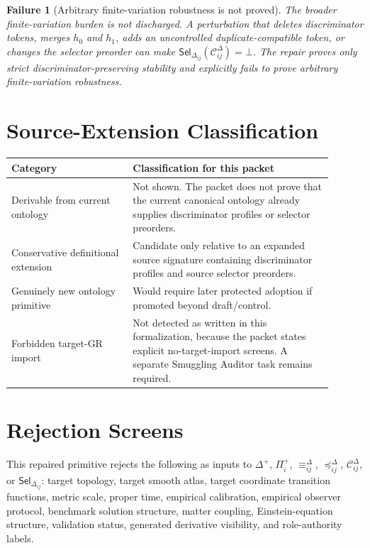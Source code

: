 \documentclass[11pt]{article}
\newcommand{\Disc}{\Delta^{+}}
\newcommand{\Prof}{\Pi^{+}}
\newcommand{\Cand}{\mathcal{C}^{\Delta}}
\newcommand{\Sel}{\mathsf{Sel}_{\Delta}}
\newtheorem{failure}{Failure}
\begin{document}
\begin{failure}[Arbitrary finite-variation robustness is not proved]
The broader finite-variation burden is not discharged. A perturbation that
deletes discriminator tokens, merges \(h_0\) and \(h_1\), adds an
uncontrolled duplicate-compatible token, or changes the selector preorder can
make \(\Sel_{ij}(\Cand_{ij})=\bot\). The repair proves only strict
discriminator-preserving stability and explicitly fails to prove arbitrary
finite-variation robustness.
\end{failure}

\section{Source-Extension Classification}

\begin{center}
\begin{tabular}{p{0.34\linewidth}p{0.56\linewidth}}
\hline
Category & Classification for this packet \\
\hline
Derivable from current ontology & Not shown. The packet does not prove that
the current canonical ontology already supplies discriminator profiles or
selector preorders. \\
Conservative definitional extension & Candidate only relative to an expanded
source signature containing discriminator profiles and source selector
preorders. \\
Genuinely new ontology primitive & Would require later protected adoption if
promoted beyond draft/control. \\
Forbidden target-GR import & Not detected as written in this formalization,
because the packet states explicit no-target-import screens. A separate
Smuggling Auditor task remains required. \\
\hline
\end{tabular}
\end{center}

\section{Rejection Screens}

This repaired primitive rejects the following as inputs to \(\Disc\),
\(\Prof_i\), \(\equiv_{ij}^{\Delta}\), \(\preceq_{ij}^{\Delta}\),
\(\Cand_{ij}\), or \(\Sel_{ij}\): target topology, target smooth atlas,
target coordinate transition functions, metric scale, proper time, empirical
calibration, empirical observer protocol, benchmark solution structure,
matter coupling, Einstein-equation structure, validation status, generated
derivative visibility, and role-authority labels.
\end{document}
